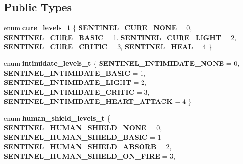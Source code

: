 \subsection*{Public Types}
\begin{DoxyCompactItemize}
\item 
\mbox{\label{structmods_1_1classes_1_1sentinel_af18552b3f0c2d66b9ab7a813c9cf6133}} 
enum {\bfseries cure\+\_\+levels\+\_\+t} \{ \newline
{\bfseries S\+E\+N\+T\+I\+N\+E\+L\+\_\+\+C\+U\+R\+E\+\_\+\+N\+O\+NE} = 0, 
{\bfseries S\+E\+N\+T\+I\+N\+E\+L\+\_\+\+C\+U\+R\+E\+\_\+\+B\+A\+S\+IC} = 1, 
{\bfseries S\+E\+N\+T\+I\+N\+E\+L\+\_\+\+C\+U\+R\+E\+\_\+\+L\+I\+G\+HT} = 2, 
{\bfseries S\+E\+N\+T\+I\+N\+E\+L\+\_\+\+C\+U\+R\+E\+\_\+\+C\+R\+I\+T\+IC} = 3, 
\newline
{\bfseries S\+E\+N\+T\+I\+N\+E\+L\+\_\+\+H\+E\+AL} = 4
 \}
\item 
\mbox{\label{structmods_1_1classes_1_1sentinel_a5398f555d03c790bcc359afdb79b6a89}} 
enum {\bfseries intimidate\+\_\+levels\+\_\+t} \{ \newline
{\bfseries S\+E\+N\+T\+I\+N\+E\+L\+\_\+\+I\+N\+T\+I\+M\+I\+D\+A\+T\+E\+\_\+\+N\+O\+NE} = 0, 
{\bfseries S\+E\+N\+T\+I\+N\+E\+L\+\_\+\+I\+N\+T\+I\+M\+I\+D\+A\+T\+E\+\_\+\+B\+A\+S\+IC} = 1, 
{\bfseries S\+E\+N\+T\+I\+N\+E\+L\+\_\+\+I\+N\+T\+I\+M\+I\+D\+A\+T\+E\+\_\+\+L\+I\+G\+HT} = 2, 
{\bfseries S\+E\+N\+T\+I\+N\+E\+L\+\_\+\+I\+N\+T\+I\+M\+I\+D\+A\+T\+E\+\_\+\+C\+R\+I\+T\+IC} = 3, 
\newline
{\bfseries S\+E\+N\+T\+I\+N\+E\+L\+\_\+\+I\+N\+T\+I\+M\+I\+D\+A\+T\+E\+\_\+\+H\+E\+A\+R\+T\+\_\+\+A\+T\+T\+A\+CK} = 4
 \}
\item 
\mbox{\label{structmods_1_1classes_1_1sentinel_a8407ad183d423872a65bf7df63dded53}} 
enum {\bfseries human\+\_\+shield\+\_\+levels\+\_\+t} \{ \newline
{\bfseries S\+E\+N\+T\+I\+N\+E\+L\+\_\+\+H\+U\+M\+A\+N\+\_\+\+S\+H\+I\+E\+L\+D\+\_\+\+N\+O\+NE} = 0, 
{\bfseries S\+E\+N\+T\+I\+N\+E\+L\+\_\+\+H\+U\+M\+A\+N\+\_\+\+S\+H\+I\+E\+L\+D\+\_\+\+B\+A\+S\+IC} = 1, 
{\bfseries S\+E\+N\+T\+I\+N\+E\+L\+\_\+\+H\+U\+M\+A\+N\+\_\+\+S\+H\+I\+E\+L\+D\+\_\+\+A\+B\+S\+O\+RB} = 2, 
{\bfseries S\+E\+N\+T\+I\+N\+E\+L\+\_\+\+H\+U\+M\+A\+N\+\_\+\+S\+H\+I\+E\+L\+D\+\_\+\+O\+N\+\_\+\+F\+I\+RE} = 3, 
\newline

\end{DoxyCompactItemize}

